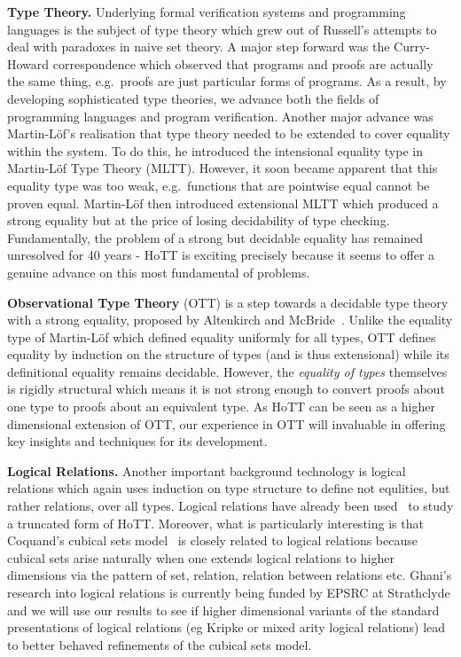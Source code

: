 \documentclass[a4paper,11pt]{article}
\newcommand{\eg}{{e.g.}\ }
\begin{document}
{\bf Type Theory.} Underlying formal verification systems and
programming languages is the subject of type theory which grew out of
Russell's attempts to deal with paradoxes in naive set theory. A major
step forward was the Curry-Howard correspondence which observed that
programs and proofs are actually the same thing, \eg proofs are just
particular forms of programs. As a result, by developing sophisticated
type theories, we advance both the fields of programming languages and
program verification. Another major advance was Martin-L\"of's realisation
that type theory needed to be extended to cover equality within the
system. %
To do this, he introduced the intensional equality type in
Martin-L\"of Type Theory (MLTT).  However, it soon became apparent
that this equality type was too weak, \eg functions that are pointwise
equal cannot be proven equal. Martin-L\"of then
introduced extensional MLTT which produced a strong equality but at
the price of losing decidability of type checking. Fundamentally, the
problem of a strong but decidable equality has remained
unresolved for 40 years - HoTT is exciting precisely because
it seems to offer a genuine advance on this most fundamental of problems. 


{\bf Observational Type Theory} (OTT) is a step towards a decidable
type theory with a strong equality, proposed by Altenkirch and
McBride~\cite{alti:ott-conf}. Unlike the equality type of Martin-L\"of
which defined equality uniformly for all types, OTT defines equality
by induction on the structure of types (and is thus extensional) while
its definitional equality remains decidable. However, the {\em
  equality of types} themselves is rigidly structural which means it
is not strong enough to convert proofs about one type to proofs about
an equivalent type. As HoTT can be seen as a higher dimensional
extension of OTT, our experience in OTT will invaluable in offering key
insights and techniques for its development.

{\bf Logical Relations.} Another important background technology is
logical relations which again uses induction on type structure to
define not equlities, but rather relations, over all types. Logical
relations have already been used~\cite{LicataHarper} to study a
truncated form of HoTT. Moreover, what is
particularly interesting is that Coquand's cubical sets
model~\cite{BezemM:cubsmt} is closely related to logical relations
because cubical sets arise naturally when one extends logical
relations to higher dimensions via the pattern of set, relation,
relation between relations etc. Ghani's research into logical relations is
currently being funded by EPSRC at Strathclyde and we will use our
results to see if higher dimensional variants of the standard
presentations of logical relations (eg Kripke or mixed arity logical
relations) lead to better behaved refinements of the cubical sets
model. 
\end{document}
